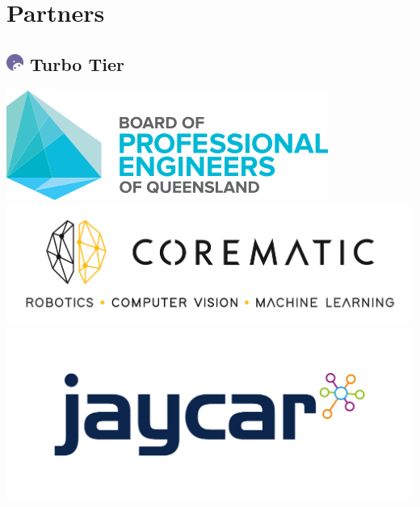 \chapter{Partners}
\section{
    \includegraphics[width=1em]{../Assets/Partner Tier Icons/Turbo.png}
    \textcolor{turbo_purple}{Turbo Tier}
}
\begin{multicols}{2}
    \includegraphics[width=0.9\linewidth]{partner-logos/BPEQ-Logo-Web.png}
    \includegraphics[width=0.9\linewidth]{partner-logos/black_corematic_logo_inline_expertises.png}
    \includegraphics[width=0.9\linewidth]{partner-logos/JAY-0002-Brand-Identity-Evolution-Logo_Full-Colour-RGB.png}
\end{multicols}

